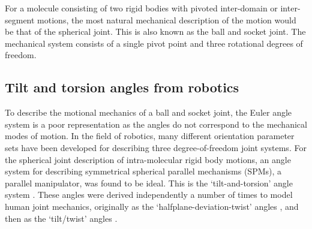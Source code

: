 For a molecule consisting of two rigid bodies with pivoted inter-domain or inter-segment motions, the most natural mechanical description of the motion would be that of the spherical joint.
This is also known as the ball and socket joint.
The mechanical system consists of a single pivot point and three rotational degrees of freedom.




\subsection{Tilt and torsion angles from robotics}

To describe the motional mechanics of a ball and socket joint, the Euler angle system is a poor representation as the angles do not correspond to the mechanical modes of motion.
In the field of robotics, many different orientation parameter sets have been developed for describing three degree-of-freedom joint systems.
For the spherical joint description of intra-molecular rigid body motions, an angle system for describing symmetrical spherical parallel mechanisms (SPMs), a parallel manipulator, was found to be ideal.
This is the `tilt-and-torsion' angle system \citep{Huang99,BonevGosselin06}.
These angles were derived independently a number of times to model human joint mechanics, originally as the `halfplane-deviation-twist' angles \citep{Korein85}, and then as the `tilt/twist' angles \citep{Crawford99}.


